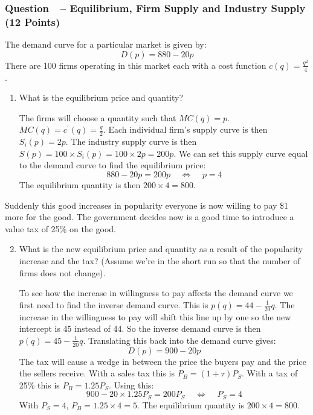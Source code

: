 \documentclass[12pt]{article}
\newcounter{question}[section]
\newcommand{\question}[1]{\refstepcounter{question}
  \subsubsection*{Question~\thequestion~-- #1}}
\newenvironment{subquestions}{
  \begin{enumerate}[label=(\roman*)]}{\end{enumerate}}
\begin{document}
\question{Equilibrium, Firm Supply and Industry Supply (12 Points)}
The demand curve for a particular market is given by:
\[
  D\left( p \right)=880-20p
\]
There are 100 firms operating in this market each with a cost function $c\left(
q \right)=\frac{q^2}{4}$.
\begin{subquestions}
  \item What is the equilibrium price and quantity?

    \textcolor{solution-color}{
      The firms will choose a quantity such that $MC\left( q \right)=p$.
      $MC\left( q \right)=c^\prime\left( q \right)=\frac{q}{2}$. Each
      individual firm's supply curve is then $S_i\left( p \right)=2p$. The
      industry supply curve is then $S\left( p \right)=100\times S_i\left( p
      \right)=100\times 2p = 200p$. We can set this supply curve equal to the
      demand curve to find the equilibrium price:
      \[
        880-20p=200p \;\;\;\;\Longleftrightarrow\;\;\;\;
        p=4
      \]
      The equilibrium quantity is then $200\times 4 = 800$.
    }
\end{subquestions}
Suddenly this good increases in popularity everyone is now willing to pay \$1
more for the good. The government decides now is a good time to introduce a
value tax of 25\% on the good.
\begin{subquestions}
  \setcounter{enumi}{1}
  \item What is the new equilibrium price and quantity as a result of the
    popularity increase and the tax? (Assume we're in the short run so that the
    number of firms does not change).

    \textcolor{solution-color}{
      To see how the increase in willingness to pay affects the demand curve we
      first need to find the inverse demand curve. This is $p\left( q
      \right)=44-\frac{1}{20}q$. The increase in the willingness to pay will
      shift this line up by one so the new intercept is 45 instead of 44. So
      the inverse demand curve is then $p\left( q
      \right)=45-\frac{1}{20}q$. Translating this back into the demand curve
      gives:
      \[
        D\left( p \right)=900-20p
      \]
      The tax will cause a wedge in between the price the buyers pay and the
      price the sellers receive. With a sales tax this is $P_B=\left( 1+\tau
      \right)P_S$. With a tax of 25\% this is $P_B=1.25 P_S$. Using this:
      \[
        900-20\times1.25 P_S = 200 P_S \;\;\;\;\Longleftrightarrow \;\;\;\; P_S=4
      \]
      With $P_S=4$, $P_B=1.25 \times 4=5$. The equilibrium quantity is
      $200\times 4 = 800$.
    }
\end{subquestions}
\end{document}
